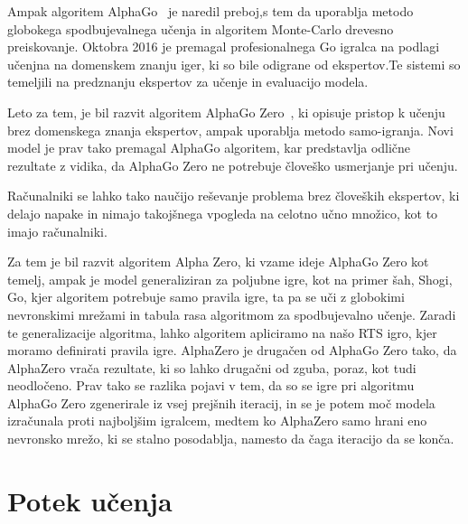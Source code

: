 \documentclass[a4paper, 12pt]{book}
\begin{document}
Ampak algoritem AlphaGo~\cite{silver2016mastering} je naredil preboj,s tem da uporablja metodo globokega spodbujevalnega učenja in algoritem Monte-Carlo drevesno preiskovanje. Oktobra 2016 je premagal profesionalnega Go igralca na podlagi učenjna na domenskem znanju iger, ki so bile odigrane od ekspertov.Te sistemi so temeljili na predznanju ekspertov za učenje in evaluacijo modela.

Leto za tem, je bil razvit algoritem AlphaGo Zero~\cite{silver2017mastering}, ki opisuje pristop k učenju brez domenskega znanja ekspertov, ampak uporablja metodo samo-igranja. Novi model je prav tako premagal AlphaGo algoritem, kar predstavlja odlične rezultate z vidika, da AlphaGo Zero ne potrebuje človeško usmerjanje pri učenju.

Računalniki se lahko tako naučijo reševanje problema brez človeških ekspertov, ki delajo napake in nimajo takojšnega vpogleda na celotno učno množico, kot to imajo računalniki.

Za tem je bil razvit algoritem Alpha Zero, ki vzame ideje AlphaGo Zero kot temelj, ampak je model generaliziran za poljubne igre, kot na primer šah, Shogi, Go, kjer algoritem potrebuje samo pravila igre, ta pa se uči z globokimi nevronskimi mrežami in tabula rasa algoritmom za spodbujevalno učenje.
Zaradi te generalizacije algoritma, lahko algoritem apliciramo na našo RTS igro, kjer moramo definirati pravila igre.
AlphaZero je drugačen od AlphaGo Zero tako, da AlphaZero vrača rezultate, ki so lahko drugačni od zguba, poraz, kot tudi neodločeno.
Prav tako se razlika pojavi v tem, da so se igre pri algoritmu AlphaGo Zero zgenerirale iz vsej prejšnih iteracij, in se je potem moč modela izračunala proti najboljšim igralcem, medtem ko AlphaZero samo hrani eno nevronsko mrežo, ki se stalno posodablja, namesto da čaga iteracijo da se konča.
\section{Potek učenja}
\end{document}
